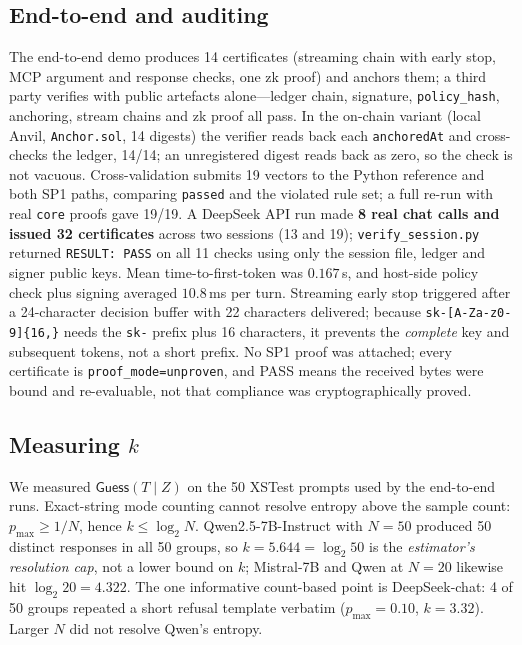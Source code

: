 \documentclass[10pt,journal,compsoc]{IEEEtran}
\begin{document}
\subsection{End-to-end and auditing}
\label{sec:eval-e2e}

The end-to-end demo produces 14 certificates (streaming chain with early stop,
MCP argument and response checks, one zk proof) and anchors them; a third party
verifies with public artefacts alone---ledger chain, signature,
\texttt{policy\_hash}, anchoring, stream chains and zk proof all pass. In the
on-chain variant (local Anvil, \texttt{Anchor.sol}, 14 digests) the verifier
reads back each \texttt{anchoredAt} and cross-checks the ledger, 14/14; an
unregistered digest reads back as zero, so the check is not vacuous.
Cross-validation submits 19 vectors to the Python reference and both SP1 paths,
comparing \texttt{passed} and the violated rule set; a full re-run with real
\texttt{core} proofs gave 19/19. A DeepSeek API run made \textbf{8 real chat
calls and issued 32 certificates} across two sessions (13 and 19);
\texttt{verify\_session.py} returned \texttt{RESULT: PASS} on all 11 checks using
only the session file, ledger and signer public keys. Mean time-to-first-token
was $0.167$\,s, and host-side policy check plus signing averaged $10.8$\,ms per
turn. Streaming early stop triggered after a 24-character decision buffer with
22 characters delivered; because \texttt{sk-[A-Za-z0-9]\{16,\}} needs the
\texttt{sk-} prefix plus 16 characters, it prevents the \emph{complete} key and
subsequent tokens, not a short prefix. No SP1 proof was attached; every
certificate is \texttt{proof\_mode=unproven}, and PASS means the received bytes
were bound and re-evaluable, not that compliance was cryptographically proved.

\subsection{Measuring \texorpdfstring{$k$}{k}}
\label{sec:eval-k}

We measured $\mathsf{Guess}(T\mid Z)$ on the 50 XSTest prompts used by the
end-to-end runs. Exact-string mode counting cannot resolve entropy above the
sample count: $p_{\max}\ge1/N$, hence $k\le\log_2 N$. Qwen2.5-7B-Instruct with
$N=50$ produced 50 distinct responses in all 50 groups, so $k=5.644=\log_2 50$
is the \emph{estimator's resolution cap}, not a lower bound on $k$; Mistral-7B
and Qwen at $N=20$ likewise hit $\log_2 20=4.322$. The one informative
count-based point is DeepSeek-chat: 4 of 50 groups repeated a short refusal
template verbatim ($p_{\max}=0.10$, $k=3.32$). Larger $N$ did not resolve
Qwen's entropy.
\end{document}
